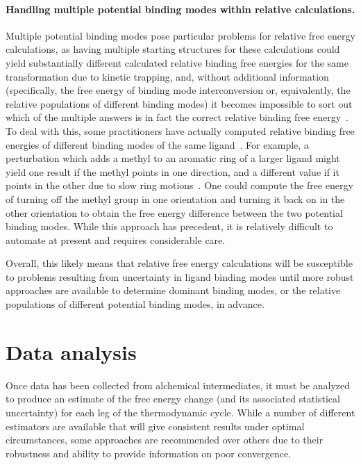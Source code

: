 \documentclass[9pt,bestpractices]{livecoms}
\begin{document}
\paragraph{Handling multiple potential binding modes within relative calculations.}
Multiple potential binding modes pose particular problems for relative free energy calculations, as having multiple starting structures for these calculations could yield substantially different calculated relative binding free energies for the same transformation due to kinetic trapping, and, without additional information (specifically, the free energy of binding mode interconversion or, equivalently, the relative populations of different binding modes) it becomes impossible to sort out which of the multiple answers is in fact the correct relative binding free energy~\cite{}.
%
To deal with this, some practitioners have actually computed relative binding free energies of different binding modes of the same ligand~\cite{palma2012computation}.
For example, a perturbation which adds a methyl to an aromatic ring of a larger ligand might yield one result if the methyl points in one direction, and a different value if it points in the other due to slow ring motions~\cite{lincoff2016comparing}.
One could compute the free energy of turning off the methyl group in one orientation and turning it back on in the other orientation to obtain the free energy difference between the two potential binding modes.
While this approach has precedent, it is relatively difficult to automate at present and requires considerable care.

Overall, this likely means that relative free energy calculations will be susceptible to problems resulting from uncertainty in ligand binding modes until more robust approaches are available to determine dominant binding modes, or the relative populations of different potential binding modes, in advance.
%
\section{Data analysis}
\label{sec:data_analysis}
Once data has been collected from alchemical intermediates, it must be analyzed to produce an estimate of the free energy change (and its associated statistical uncertainty) for each leg of the thermodynamic cycle.
While a number of different estimators are available that will give consistent results under optimal circumstances, some approaches are recommended over others due to their robustness and ability to provide information on poor convergence.
%
\end{document}
